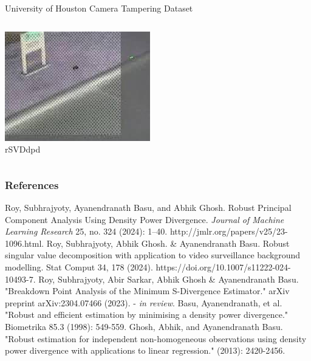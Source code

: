 \documentclass[10pt]{beamer}
\begin{document}
\begin{frame}{University of Houston Camera Tampering Dataset}
\begin{columns}
{            \includegraphics[width = \textwidth]{figures/rsvd_uhctd/rsvddpdfg_frame75.jpg}\\
            {\centering rSVDdpd}
        }
    \end{columns}
\end{frame}


\begin{frame}[shrink=20]
\frametitle{References}
    \begin{thebibliography}{9}
         Roy, Subhrajyoty, Ayanendranath Basu, and Abhik Ghosh. Robust Principal Component Analysis Using Density Power Divergence. \emph{Journal of Machine Learning Research} 25, no. 324 (2024): 1–40. http://jmlr.org/papers/v25/23-1096.html.
         Roy, Subhrajyoty, Abhik Ghosh. \& Ayanendranath Basu. Robust singular value decomposition with application to video surveillance background modelling. Stat Comput 34, 178 (2024). https://doi.org/10.1007/s11222-024-10493-7.
         Roy, Subhrajyoty, Abir Sarkar, Abhik Ghosh \& Ayanendranath Basu. "Breakdown Point Analysis of the Minimum S-Divergence Estimator." arXiv preprint arXiv:2304.07466 (2023). - \textit{in review}.
         Basu, Ayanendranath, et al. "Robust and efficient estimation by minimising a density power divergence." Biometrika 85.3 (1998): 549-559.
         Ghosh, Abhik, and Ayanendranath Basu. "Robust estimation for independent non-homogeneous observations using density power divergence with applications to linear regression." (2013): 2420-2456.
    \end{thebibliography}
\end{frame}
\end{document}
